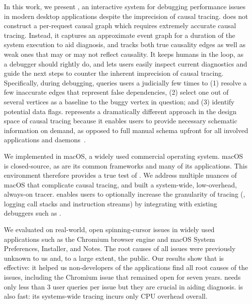 In this work, we present \xxx, an interactive system for debugging performance
issues in modern desktop applications despite the imprecision of causal tracing.
\xxx does not construct a per-request causal graph which requires extremely
accurate causal tracing. Instead, it captures an approximate event graph for
a duration of the system execution to aid diagnosis, and tracks both true
causality edges as well as weak ones that may or may not reflect causality.
It keeps humans in the loop, as a debugger should rightly do, and lets users
easily inspect current diagnostics and guide the next steps to counter the
inherent imprecision of causal tracing. Specifically, during debugging, \xxx
queries users a judicially few times to (1) resolve a few inaccurate edges
that represent false dependencies, (2) select one out of several vertices as a
baseline to the buggy vertex in question; and (3) identify potential data flags.
\xxx represents a dramatically different approach in the design space of causal
tracing because it enables users to provide necessary schematic information on
demand, as opposed to full manual schema upfront for all involved applications
and daemons~\cite{barham2004using}.

We implemented \xxx in macOS, a widely used commercial operating system. macOS
is closed-source, as are its common frameworks and many of its applications.
This environment therefore provides a true test of \xxx. We address multiple
nuances of macOS that complicate causal tracing, and built a system-wide,
low-overhead, always-on tracer. \xxx enables users to optionally increase the
granularity of tracing (\eg, logging call stacks and instruction streams) by
integrating with existing debuggers such as .

We evaluated \xxx on \nbug real-world, open spinning-cursor issues in widely
used applications such as the Chromium browser engine and macOS System
Preferences, Installer, and Notes. The root causes of all \nbug issues were
previously unknown to us and, to a large extent, the public. Our results show
that \xxx is effective: it helped us non-developers of the applications find all
root causes of the issues, including the Chromium issue that remained open for
seven years. \xxx needs only less than 3 user queries per issue but they are
crucial in aiding diagnosis. \xxx is also fast: its systems-wide tracing incurs
only \cpuoverhead CPU overhead overall.


